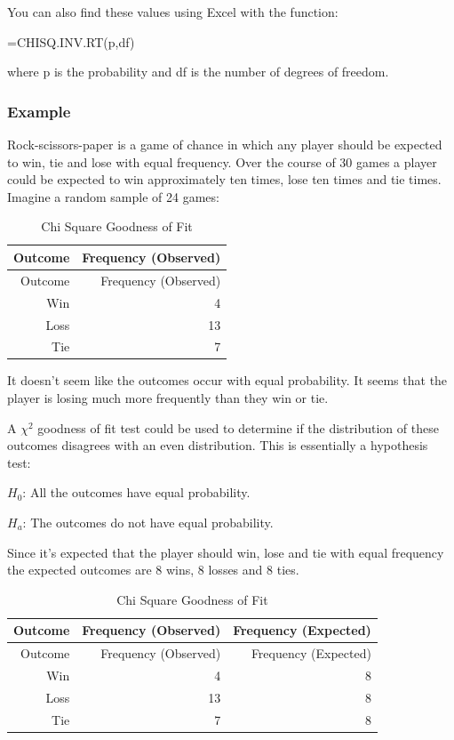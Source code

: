 \documentclass[
]{book}
\begin{document}
You can also find these values using Excel with the function:

=CHISQ.INV.RT(p,df)

where p is the probability and df is the number of degrees of freedom.

\hypertarget{example-14}{%
\subsubsection{Example}\label{example-14}}

Rock-scissors-paper is a game of chance in which any player should be expected to win, tie and lose with equal frequency. Over the course of 30 games a player could be expected to win approximately ten times, lose ten times and tie times. Imagine a random sample of 24 games:

\begin{longtable}[]{@{}rr@{}}
\caption{\label{tab:table011} Chi Square Goodness of Fit}\tabularnewline
\toprule
Outcome & Frequency (Observed) \\
\midrule
\endfirsthead
\toprule
Outcome & Frequency (Observed) \\
\midrule
\endhead
Win & 4 \\
Loss & 13 \\
Tie & 7 \\
\bottomrule
\end{longtable}

It doesn't seem like the outcomes occur with equal probability. It seems that the player is losing much more frequently than they win or tie.

A \(\chi^2\) goodness of fit test could be used to determine if the distribution of these outcomes disagrees with an even distribution. This is essentially a hypothesis test:

\(H_0\): All the outcomes have equal probability.

\(H_a\): The outcomes do not have equal probability.

Since it's expected that the player should win, lose and tie with equal frequency the expected outcomes are 8 wins, 8 losses and 8 ties.

\begin{longtable}[]{@{}rrr@{}}
\caption{\label{tab:table0011} Chi Square Goodness of Fit}\tabularnewline
\toprule
Outcome & Frequency (Observed) & Frequency (Expected) \\
\midrule
\endfirsthead
\toprule
Outcome & Frequency (Observed) & Frequency (Expected) \\
\midrule
\endhead
Win & 4 & 8 \\
Loss & 13 & 8 \\
Tie & 7 & 8 \\
\bottomrule
\end{longtable}
\end{document}
